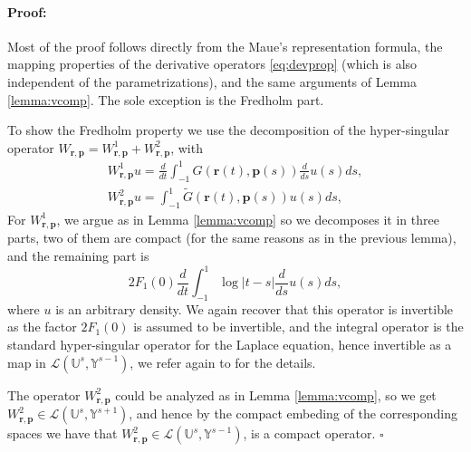 \documentclass{article}
\newenvironment{proof}{\paragraph{Proof:}}{\hfill$\square$}
\newcommand{\IU}{{\mathbb U}}
\newcommand{\IY}{{\mathbb Y}}
\newcommand{\bp}{{\bm p}}
\newcommand{\br}{\bm{r}}
\begin{document}
\begin{proof}
Most of the proof follows directly from the Maue's representation formula, the mapping properties of the derivative operators \eqref{eq:devprop} (which is also independent of the parametrizations), and the same arguments of Lemma \ref{lemma:vcomp}.
The sole exception is the Fredholm part. 

To show the Fredholm property we use the decomposition of the hyper-singular  operator $W_{\br,\bp}=W^1_{\br,\bp}+W^2_{\br,\bp}$, with 
\begin{align*}
W^1_{\br,\bp}u=\frac{d}{dt}
 \int_{-1}^1 G(\br(t),\bp(s))\frac{d}{ds}u(s) ds, \\ 
W^2_{\br,\bp}u= \int_{-1}^1\widetilde{G}(\br(t),\bp(s))u(s)ds,
\end{align*}
For $W^1_{\br,\bp}$, we argue as in Lemma \ref{lemma:vcomp} so we decomposes it in three parts, two of them are compact (for the same reasons as in the previous lemma), and the remaining part is 
$$
2F_1(0) \frac{d}{dt} \int_{-1}^1 \log|t-s| \frac{d}{ds}u (s)ds,
$$
where $u$ is an arbitrary density. We again recover that this operator is invertible as the factor $2F_1(0)$ is assumed to be invertible, and the integral operator is the standard hyper-singular operator for the Laplace equation, hence invertible as a map in $\mathcal{L}(\IU^s,\IY^{s-1})$, we refer again to \cite{JEREZHANCKES2011547} for the details.

The operator $W^2_{\br,\bp}$ could be analyzed as in Lemma \ref{lemma:vcomp}, so we get $W^2_{\br,\bp} \in \mathcal{L}\left( \IU^s,\IY^{s+1}\right)$, and hence by the compact embeding of the corresponding spaces we have that $W^2_{\br,\bp} \in \mathcal{L}\left( \IU^s,\IY^{s-1}\right)$, is a compact operator.
\end{proof}
\end{document}

